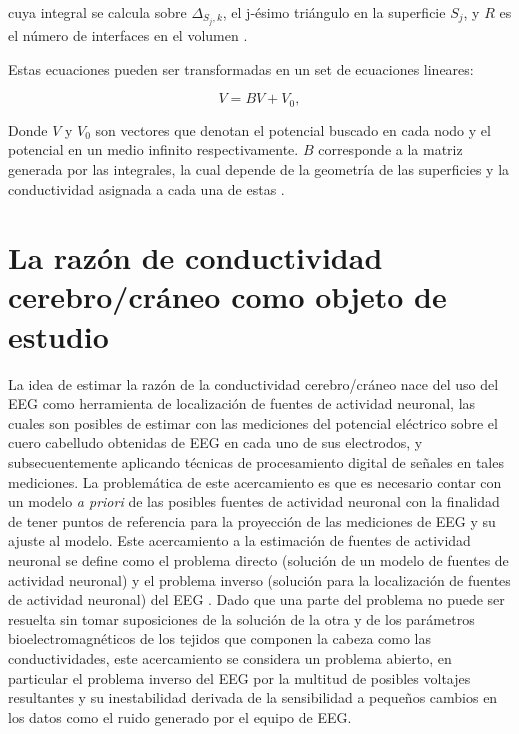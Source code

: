 cuya integral se calcula sobre $\Delta_{S_{j},k}$, el j-ésimo triángulo en la superficie $S_{j}$, y $R$ es el número de interfaces en el volumen \cite{Hallez2007}.

Estas ecuaciones pueden ser transformadas en un set de ecuaciones lineares:

\begin{equation}
	\label{lineal}
	V = BV + V_{0},
\end{equation}

Donde $V$ y $V_{0}$ son vectores que denotan el potencial buscado en cada nodo y el potencial en un medio infinito respectivamente. $B$ corresponde a la matriz generada por las integrales, la cual depende de la geometría de las superficies y la conductividad asignada a cada una de estas \cite{Hallez2007}.



\section{La razón de conductividad cerebro/cráneo como objeto de estudio}
\label{sec:intro:study}

La idea de estimar la razón de la conductividad cerebro/cráneo nace del uso del EEG como herramienta de localización de fuentes de actividad neuronal, las cuales son posibles de estimar con las mediciones del potencial eléctrico sobre el cuero cabelludo obtenidas de EEG en cada uno de sus electrodos, y subsecuentemente aplicando técnicas de procesamiento digital de señales en tales mediciones. La problemática de este acercamiento es que es necesario contar con un modelo \emph{a priori} de las posibles fuentes de actividad neuronal con la finalidad de tener puntos de referencia para la proyección de las mediciones de EEG y su ajuste al modelo. Este acercamiento a la estimación de fuentes de actividad neuronal se define como el problema directo (solución de un modelo de fuentes de actividad neuronal) y el problema inverso (solución para la localización de fuentes de actividad neuronal) del EEG \cite{Grech2008}. Dado que una parte del problema no puede ser resuelta sin tomar suposiciones de la solución de la otra y de los parámetros bioelectromagnéticos de los tejidos que componen la cabeza como las conductividades, este acercamiento se considera un problema abierto, en particular el problema inverso del EEG por la multitud de posibles voltajes resultantes y su inestabilidad derivada de la sensibilidad a pequeños cambios en los datos como el ruido generado por el equipo de EEG. 

